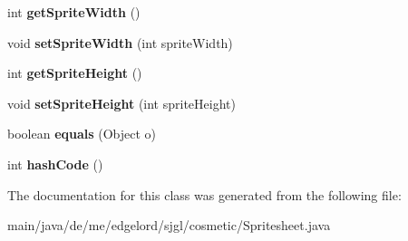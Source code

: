 \begin{DoxyCompactItemize}
int {\bfseries get\+Sprite\+Width} ()
\item 
\mbox{\label{classde_1_1me_1_1edgelord_1_1sjgl_1_1cosmetic_1_1_spritesheet_abe0aae33bdd1442c6f35d79702128c3b}} 
void {\bfseries set\+Sprite\+Width} (int sprite\+Width)
\item 
\mbox{\label{classde_1_1me_1_1edgelord_1_1sjgl_1_1cosmetic_1_1_spritesheet_a5b3a175aec41ad5f588cfc1f756785c4}} 
int {\bfseries get\+Sprite\+Height} ()
\item 
\mbox{\label{classde_1_1me_1_1edgelord_1_1sjgl_1_1cosmetic_1_1_spritesheet_ab4168e2f4f695a60b3d5a08ab67c22de}} 
void {\bfseries set\+Sprite\+Height} (int sprite\+Height)
\item 
\mbox{\label{classde_1_1me_1_1edgelord_1_1sjgl_1_1cosmetic_1_1_spritesheet_af8e333cd584e92ce7479ee24191db3ce}} 
boolean {\bfseries equals} (Object o)
\item 
\mbox{\label{classde_1_1me_1_1edgelord_1_1sjgl_1_1cosmetic_1_1_spritesheet_a09c4b58fc9bfb77d0af030fbb96b5167}} 
int {\bfseries hash\+Code} ()
\end{DoxyCompactItemize}


The documentation for this class was generated from the following file\+:\begin{DoxyCompactItemize}
\item 
main/java/de/me/edgelord/sjgl/cosmetic/Spritesheet.\+java\end{DoxyCompactItemize}
